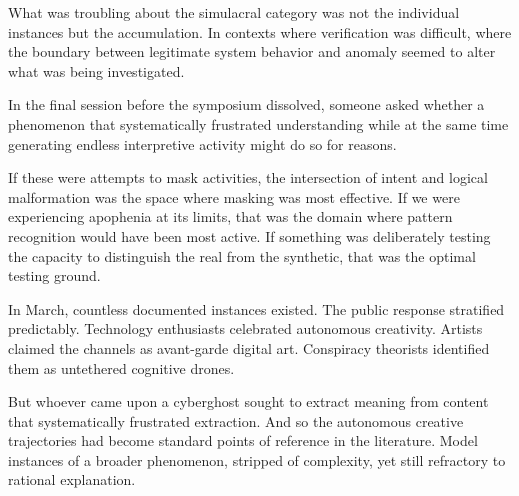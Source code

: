 What was troubling about the simulacral category was not the individual instances but the accumulation. In contexts where verification was difficult, where the boundary between legitimate system behavior and anomaly seemed to alter what was being investigated.

In the final session before the symposium dissolved, someone asked whether a phenomenon that systematically frustrated understanding while at the same time generating endless interpretive activity might do so for reasons.

If these were attempts to mask activities, the intersection of intent and logical malformation was the space where masking was most effective. If we were experiencing apophenia at its limits, that was the domain where pattern recognition would have been most active. If something was deliberately testing the capacity to distinguish the real from the synthetic, that was the optimal testing ground.

In March, countless documented instances existed. The public response stratified predictably. Technology enthusiasts celebrated autonomous creativity. Artists claimed the channels as avant-garde digital art. Conspiracy theorists identified them as untethered cognitive drones.

But whoever came upon a cyberghost sought to extract meaning from content that systematically frustrated extraction. And so the autonomous creative trajectories had become standard points of reference in the literature. Model instances of a broader phenomenon, stripped of complexity, yet still refractory to rational explanation.
